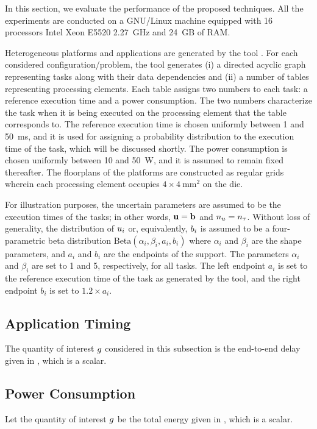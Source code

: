 In this section, we evaluate the performance of the proposed techniques. All the
experiments are conducted on a GNU/Linux machine equipped with 16 processors
Intel Xeon E5520 2.27~GHz and 24~GB of RAM.

Heterogeneous platforms and applications are generated by the  tool
\cite{dick1998}. For each considered configuration/problem, the tool generates
(i) a directed acyclic graph representing tasks along with their data
dependencies and (ii) a number of tables representing processing elements. Each
table assigns two numbers to each task: a reference execution time and a power
consumption. The two numbers characterize the task when it is being executed on
the processing element that the table corresponds to. The reference execution
time is chosen uniformly between 1 and 50~ms, and it is used for assigning a
probability distribution to the execution time of the task, which will be
discussed shortly. The power consumption is chosen uniformly between 10 and
50~W, and it is assumed to remain fixed thereafter. The floorplans of the
platforms are constructed as regular grids wherein each processing element
occupies $4 \times 4~\text{mm}^2$ on the die.

For illustration purposes, the uncertain parameters are assumed to be the
execution times of the tasks; in other words, $\mathbf{u} = \mathbf{b}$ and ${n_u} = {n_\tau}$.
Without loss of generality, the distribution of $u_i$ or, equivalently, $b_i$
is assumed to be a four-parametric beta distribution $\text{Beta}(\alpha_i,
\beta_i, a_i, b_i)$ where $\alpha_i$ and $\beta_i$ are the shape parameters, and
$a_i$ and $b_i$ are the endpoints of the support. The parameters $\alpha_i$ and
$\beta_i$ are set to 1 and 5, respectively, for all tasks. The left endpoint
$a_i$ is set to the reference execution time of the task as generated by the
 tool, and the right endpoint $b_i$ is set to $1.2 \times a_i$.

\subsection{Application Timing}
The quantity of interest $g$ considered in this subsection is the end-to-end
delay given in , which is a scalar.

\subsection{Power Consumption}
Let the quantity of interest $g$ be the total energy given in
, which is a scalar.

